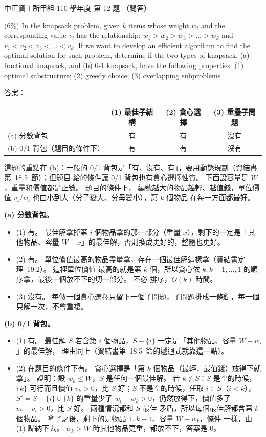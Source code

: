 \begin{pastexam}[label={px:ccu-110-swa-10}]{中正資工所甲組 110 學年度 第 12 題}
（問答）

(6\%) In the knapsack problem, given $k$ items whose weight $w_i$ and the corresponding value $v_i$
has the relationship: $w_1>w_2>w_3>\ldots>w_k$ and $v_1<v_2<v_3<\ldots<v_k$. If we want to develop
an efficient algorithm to find the optimal solution for such problem, determine if the two types
of knapsack, (a) fractional knapsack, and (b) 0-1 knapsack, have the following properties:
(1) optimal substructure; (2) greedy choice; (3) overlapping subproblems
\end{pastexam}

\begin{pastsoln}
答案：
\begin{center}
\begin{tabular}{lccc}
\toprule
& (1) 最佳子結構 & (2) 貪心選擇 & (3) 重疊子問題 \\
\midrule
(a) 分數背包 & 有 & 有 & 沒有 \\
(b) 0/1 背包（題目的條件下） & 有 & 有 & 沒有 \\
\bottomrule
\end{tabular}
\end{center}
這題的重點在 (b)：一般的 0/1 背包是「有、沒有、有」，要用動態規劃（資結書第~18.5~節）；但題目
給的條件讓 0/1 背包也有貪心選擇性質。 下面設容量是 $W$，重量和價值都是正數。 題目的條件下，
編號越大的物品越輕、越值錢，單位價值 $v_i / w_i$ 也由小到大（分子變大、分母變小），第 $k$ 個物品
在每一方面都最好。

\textbf{(a) 分數背包。}
\begin{itemize}
\item (1) 有。 最佳解拿掉第 $i$ 個物品拿的那一部分（重量 $x$），剩下的一定是「其他物品、容量
$W - x$」的最佳解，否則換成更好的，整體也更好。
\item (2) 有。 單位價值最高的物品盡量拿，存在一個最佳解這樣拿（資結書定理~19.2）。 這裡單位價值
最高的就是第 $k$ 個，所以貪心依 $k, k - 1, \ldots, 1$ 的順序拿，最後一個放不下的切一部分。 不必
排序，$O(k)$ 時間。
\item (3) 沒有。 每做一個貪心選擇只留下一個子問題，子問題排成一條鏈，每一個只解一次，不會重複。
\end{itemize}

\textbf{(b) 0/1 背包。}
\begin{itemize}
\item (1) 有。 最佳解 $S$ 若含第 $i$ 個物品，$S - \{i\}$ 一定是「其他物品、容量 $W - w_i$」的最佳解，
理由同上（資結書第~18.5~節的遞迴式就靠這一點）。
\item (2) 在題目的條件下有。 貪心選擇是「第 $k$ 個物品（最輕、最值錢）放得下就拿」。 證明：設
$w_k \le W$，$S$ 是任何一個最佳解。 若 $k \notin S$：$S$ 是空的時候，$\{k\}$ 可行而且價值
$v_k > 0$，比 $S$ 好；$S$ 不是空的時候，任取 $i \in S$（$i < k$），$S' = S - \{i\} \cup \{k\}$
的重量少了 $w_i - w_k > 0$，仍然放得下，價值多了 $v_k - v_i > 0$，比 $S$ 好。 兩種情況都和 $S$ 最佳
矛盾，所以每個最佳解都含第 $k$ 個物品。 拿了之後，剩下的是物品 $1..k-1$、容量 $W - w_k$，條件
一樣，由 (1) 歸納下去。 $w_k > W$ 時其他物品更重，都放不下，答案是 $0$。


\end{itemize}
\end{pastsoln}
